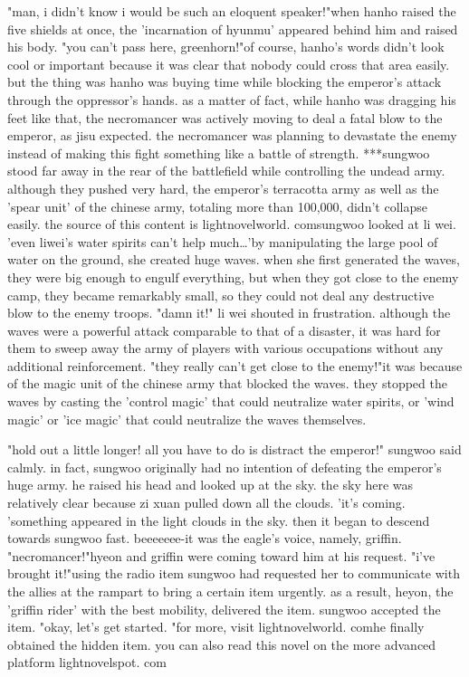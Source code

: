 "man, i didn't know i would be such an eloquent speaker!"when hanho raised the five shields at once, the 'incarnation of hyunmu' appeared behind him and raised his body.
 "you can't pass here, greenhorn!"of course, hanho's words didn't look cool or important because it was clear that nobody could cross that area easily.
 but the thing was hanho was buying time while blocking the emperor's attack through the oppressor's hands.
 as a matter of fact, while hanho was dragging his feet like that, the necromancer was actively moving to deal a fatal blow to the emperor, as jisu expected.
the necromancer was planning to devastate the enemy instead of making this fight something like a battle of strength.
***sungwoo stood far away in the rear of the battlefield while controlling the undead army.
 although they pushed very hard, the emperor's terracotta army as well as the 'spear unit' of the chinese army, totaling more than 100,000, didn't collapse easily.
the source of this content is lightnov­elworld.
comsungwoo looked at li wei.
'even liwei's water spirits can't help much…'by manipulating the large pool of water on the ground, she created huge waves.
 when she first generated the waves, they were big enough to engulf everything, but when they got close to the enemy camp, they became remarkably small, so they could not deal any destructive blow to the enemy troops.
"damn it!" li wei shouted in frustration.
 although the waves were a powerful attack comparable to that of a disaster, it was hard for them to sweep away the army of players with various occupations without any additional reinforcement.
"they really can't get close to the enemy!"it was because of the magic unit of the chinese army that blocked the waves.
 they stopped the waves by casting the 'control magic' that could neutralize water spirits, or 'wind magic' or 'ice magic' that could neutralize the waves themselves.


"hold out a little longer! all you have to do is distract the emperor!" sungwoo said calmly.
in fact, sungwoo originally had no intention of defeating the emperor's huge army.
he raised his head and looked up at the sky.
 the sky here was relatively clear because zi xuan pulled down all the clouds.
'it's coming.
'something appeared in the light clouds in the sky.
 then it began to descend towards sungwoo fast.
 beeeeeee-it was the eagle's voice, namely, griffin.
"necromancer!"hyeon and griffin were coming toward him at his request.
"i've brought it!"using the radio item sungwoo had requested her to communicate with the allies at the rampart to bring a certain item urgently.
as a result, heyon, the 'griffin rider' with the best mobility, delivered the item.
sungwoo accepted the item.
 "okay, let's get started.
"for more, visit lightnovelworld.
comhe finally obtained the hidden item.
 you can also read this novel on the more advanced platform lightnovelspot.
com

 